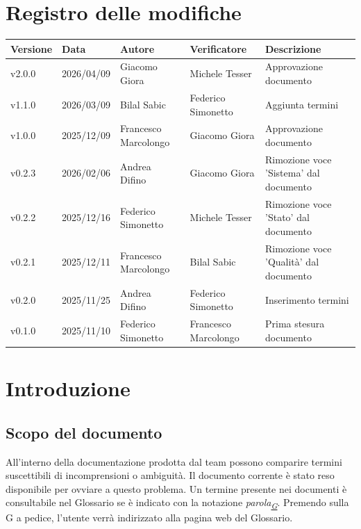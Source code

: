 \documentclass[a4paper,12pt]{article}
\begin{document}
\section*{Registro delle modifiche}
    \begin{center}
        \begin{tabularx}{\textwidth}{|l|l|l|l|X|}
            \hline
            \textbf{Versione} & \textbf{Data} & \textbf{Autore} & \textbf{Verificatore} & \textbf{Descrizione} \\
            \hline
            v2.0.0 & 2026/04/09 & Giacomo Giora & Michele Tesser & Approvazione documento \\
            \hline
            v1.1.0 & 2026/03/09 & Bilal Sabic & Federico Simonetto & Aggiunta termini \\
            \hline
            v1.0.0 & 2025/12/09 & Francesco Marcolongo & Giacomo Giora & Approvazione documento\\
            \hline
            v0.2.3 & 2026/02/06 & Andrea Difino & Giacomo Giora & Rimozione voce 'Sistema' dal documento\\
            \hline
            v0.2.2 & 2025/12/16 & Federico Simonetto & Michele Tesser & Rimozione voce 'Stato' dal documento\\
            \hline
            v0.2.1 & 2025/12/11 & Francesco Marcolongo & Bilal Sabic & Rimozione voce 'Qualità' dal documento\\
            \hline
            v0.2.0 & 2025/11/25 & Andrea Difino & Federico Simonetto & Inserimento termini\\
            \hline
            v0.1.0 & 2025/11/10 & Federico Simonetto & Francesco Marcolongo & Prima stesura documento\\
            \hline
        \end{tabularx}
    \end{center}


\newpage

\tableofcontents


\newpage
\section{Introduzione}
    
    \subsection{Scopo del documento}
        All'interno della documentazione prodotta dal team possono comparire termini suscettibili di incomprensioni o ambiguità. Il documento corrente è stato reso disponibile per ovviare a questo problema. Un termine presente nei documenti è consultabile nel Glossario se è indicato con la notazione \textit{parola\textsubscript{\href{https://atlasteam9.github.io/Atlas/glossario.html}{G}}}.
        Premendo sulla G a pedice, l'utente verrà indirizzato alla pagina web del Glossario.
    
\end{document}

